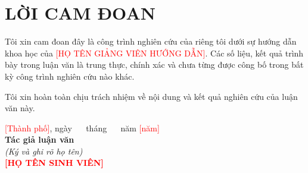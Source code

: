 \chapter*{LỜI CAM ĐOAN}

Tôi xin cam đoan đây là công trình nghiên cứu của riêng tôi dưới sự hướng dẫn khoa học của \textcolor{red}{[HỌ TÊN GIẢNG VIÊN HƯỚNG DẪN]}. Các số liệu, kết quả trình bày trong luận văn là trung thực, chính xác và chưa từng được công bố trong bất kỳ công trình nghiên cứu nào khác.

Tôi xin hoàn toàn chịu trách nhiệm về nội dung và kết quả nghiên cứu của luận văn này.

\vspace{1.5cm}
\begin{flushright}
\textcolor{red}{[Thành phố]}, ngày \textcolor{red}{\ \ } tháng \textcolor{red}{\ \ } năm \textcolor{red}{[năm]}\\[0.6cm]
\textbf{Tác giả luận văn}\\[2cm]
\textit{(Ký và ghi rõ họ tên)}\\[0.4cm]
\textbf{\textcolor{red}{[HỌ TÊN SINH VIÊN]}}
\end{flushright}
\newpage
